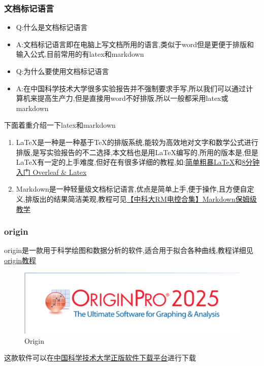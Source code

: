 \documentclass{ctexart}
\begin{document}
\subsubsection{文档标记语言}
\begin{itemize}
    \item Q:什么是文档标记语言
    \item A:文档标记语言即在电脑上写文档所用的语言,类似于word但是更便于排版和输入公式,目前常用的有latex和markdown
    \item Q:为什么要使用文档标记语言
    \item A:在中国科学技术大学很多实验报告并不强制要求手写,所以我们可以通过计算机来提高生产力,但是直接用word不好排版,所以一般都采用latex或markdown
\end{itemize}
\par 下面着重介绍一下latex和markdown
\begin{enumerate}
    \item \LaTeX 是一种是一种基于\TeX 的排版系统,能较为高效地对文字和数学公式进行排版,是写实验报告的不二选择,本文档也是用\LaTeX 编写的,所用的版本是\LaTeXe ,但是\LaTeX 有一定的上手难度,但好在有很多详细的教程,如:\href{https://github.com/kiri236/Guide-for-exchange-student-in-USTC/blob/main/PDF/Latex/%E7%AE%80%E5%8D%95%E7%B2%97%E6%9A%B4latex.pdf}{简单粗暴\LaTeX}和\href{https://www.bilibili.com/video/BV1cg411V7hW/?spm_id_from=333.337.search-card.all.click}{8分钟入门 Overleaf \& Latex}
    \item Markdown是一种轻量级文档标记语言,优点是简单上手,便于操作,且方便自定义,排版出的结果简洁美观,教程可见\href{https://www.bilibili.com/video/BV172421w7Ba/?spm_id_from=333.337.search-card.all.click}{【中科大RM电控合集】Markdown保姆级教学}%
\end{enumerate}
\subsubsection{origin}
origin是一款用于科学绘图和数据分析的软件,适合用于拟合各种曲线,教程详细见\href{https://www.bilibili.com/video/BV1BA411i7PT/?spm_id_from=333.337.search-card.all.click}{origin教程}
\begin{figure}[!htbp]
    \centering
    \includegraphics[scale=0.4]{origin.png}
    \caption{Origin}
\end{figure}
\par 这款软件可以在\href{https://software.ustc.edu.cn/zbh.php}{中国科学技术大学正版软件下载平台}进行下载
\end{document}
